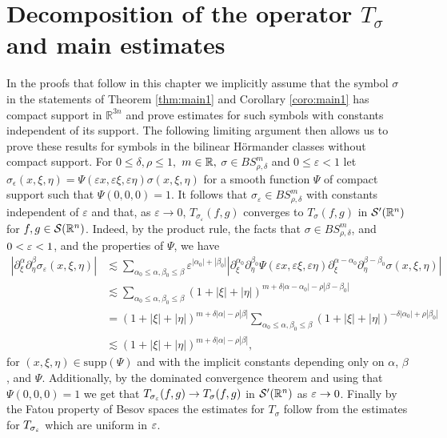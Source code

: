 \section{Decomposition of the operator $T_\sigma$ and main estimates}\label{sec:decomp}
In the proofs that follow in this chapter we implicitly assume that the symbol $\sigma$ in the statements of Theorem \ref{thm:main1} and Corollary \ref{coro:main1} has compact support in $\mathbb{R}^{3n}$ and prove estimates for such symbols with constants independent of its support. The following limiting argument then allows us to prove these results for symbols in the bilinear H\"ormander classes without compact support. For $0\le \delta,\rho\le 1,$ $m\in\mathbb{R},$ $\sigma\in BS^m_{\rho,\delta}$ and $0\le \varepsilon<1$ let $\sigma_\epsilon (x,\xi,\eta) = \Psi(\varepsilon x, \varepsilon \xi, \varepsilon \eta) \sigma( x, \xi,\eta)$ for a smooth  function $\Psi$ of compact support such that $\Psi(0,0,0) = 1$. It follows that $\sigma_\varepsilon \in BS^m_{\rho,\delta}$ with constants independent of $\varepsilon$ and that, as $\varepsilon \rightarrow 0$, $T_{\sigma_\varepsilon}(f,g)$ converges to $T_\sigma(f,g)$ in ${\mathcal{S}'}({{\mathbb R}^n})$ for $f,g \in {\mathcal{S}}({{\mathbb R}^n})$. Indeed, by the product rule, the facts that $\sigma \in BS^m_{\rho,\delta}$, and $0<\varepsilon<1$, and the properties of $\Psi$, we have
\begin{align*}
|\partial^\alpha_\xi \partial^\beta_\eta \sigma_\varepsilon(x,\xi,\eta)| & 
\lesssim \sum_{\alpha_0 \leq \alpha, \beta_0 \leq \beta} \varepsilon^{|\alpha_0| + |\beta_0|}|\partial^{\alpha_0}_\xi \partial^{\beta_0}_\eta \Psi(\varepsilon x, \varepsilon \xi, \varepsilon \eta) \partial^{\alpha - \alpha_0}_\xi \partial^{\beta - \beta_0}_\eta \sigma(x,\xi,\eta) | \\
& \lesssim \sum_{\alpha_0 \leq \alpha, \beta_0 \leq \beta} (1 + |\xi| + |\eta|)^{m + \delta|\alpha - \alpha_0| - \rho|\beta - \beta_0|} \\
& =(1 + |\xi| + |\eta|)^{m + \delta|\alpha| - \rho|\beta|} \sum_{\alpha_0 \leq \alpha, \beta_0 \leq \beta} (1 + |\xi| + |\eta|)^{-\delta| \alpha_0| + \rho|\beta_0|} \\
& \lesssim (1 + |\xi| + |\eta|)^{m + \delta|\alpha| - \rho|\beta|},
\end{align*}
for $(x,\xi,\eta) \in \text{supp}(\Psi)$ and with the implicit constants depending only on $\alpha$, $\beta$, and $\Psi$. Additionally, by the dominated convergence theorem and using that  $\Psi(0,0,0) = 1$ we get that $T_{\sigma_\varepsilon}(f,g) \rightarrow T_\sigma(f,g)$ in ${\mathcal{S}'}({{\mathbb R}^n})$ as $\varepsilon \rightarrow 0$. Finally by the Fatou property of Besov spaces the estimates for $T_\sigma$ follow from the estimates for $T_{\sigma_\varepsilon}$ which are uniform in $\varepsilon$. 

